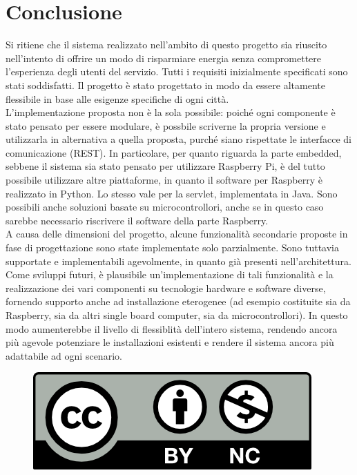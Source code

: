 \chapter{Conclusione} 

Si ritiene che il sistema realizzato nell'ambito di questo progetto sia riuscito nell'intento di offrire un modo di risparmiare energia senza compromettere l'esperienza degli utenti del servizio.
Tutti i requisiti inizialmente specificati sono stati soddisfatti. Il progetto è stato progettato in modo da essere altamente flessibile in base alle esigenze specifiche di ogni città.
\\L'implementazione proposta non è la sola possibile: poiché ogni componente è stato pensato per essere modulare, è possbile scriverne la propria versione e utilizzarla in alternativa a quella proposta, purché siano rispettate le interfacce di comunicazione (REST).
In particolare, per quanto riguarda la parte embedded, sebbene il sistema sia stato pensato per utilizzare Raspberry Pi, è del tutto possibile utilizzare altre piattaforme, in quanto il software per Raspberry è realizzato in Python. Lo stesso vale per la servlet, implementata in Java.
Sono possibili anche soluzioni basate su microcontrollori, anche se in questo caso sarebbe necessario riscrivere il software della parte Raspberry.
\\A causa delle dimensioni del progetto, alcune funzionalità secondarie proposte in fase di progettazione sono state implementate solo parzialmente. Sono tuttavia supportate e implementabili agevolmente, in quanto già presenti nell'architettura.
Come sviluppi futuri, è plausibile un'implementazione di tali funzionalità e la realizzazione dei vari componenti su tecnologie hardware e software diverse, fornendo supporto anche ad installazione eterogenee (ad esempio costituite sia da Raspberry, sia da altri single board computer, sia da microcontrollori).
In questo modo aumenterebbe il livello di flessiblità dell'intero sistema, rendendo ancora più agevole potenziare le installazioni esistenti e rendere il sistema ancora più adattabile ad ogni scenario.
\begin{figure}[b]
	\centering
	\includegraphics[scale=1.0]{figure/cc-by-nc.png}
\end{figure}

